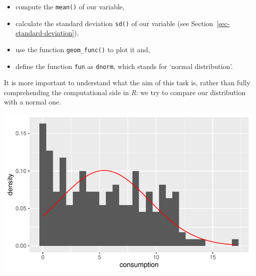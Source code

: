 \documentclass[
  letterpaper,
]{krantz}
\makeatletter
\newenvironment{Shaded}{\begin{snugshade}}{\end{snugshade}}
\newcommand{\AttributeTok}[1]{\textcolor[rgb]{0.40,0.45,0.13}{#1}}
\newcommand{\CommentTok}[1]{\textcolor[rgb]{0.37,0.37,0.37}{#1}}
\newcommand{\DecValTok}[1]{\textcolor[rgb]{0.68,0.00,0.00}{#1}}
\newcommand{\FunctionTok}[1]{\textcolor[rgb]{0.28,0.35,0.67}{#1}}
\newcommand{\NormalTok}[1]{\textcolor[rgb]{0.00,0.23,0.31}{#1}}
\newcommand{\SpecialCharTok}[1]{\textcolor[rgb]{0.37,0.37,0.37}{#1}}
\newcommand{\StringTok}[1]{\textcolor[rgb]{0.13,0.47,0.30}{#1}}
\newenvironment{kframe}{%
\medskip{}
\setlength{\fboxsep}{.8em}
 \def\at@end@of@kframe{}%
 \ifinner\ifhmode%
  \def\at@end@of@kframe{\end{minipage}}%
  \begin{minipage}{\columnwidth}%
 \fi\fi%
 \def\FrameCommand##1{\hskip\@totalleftmargin \hskip-\fboxsep
 \colorbox{shadecolor}{##1}\hskip-\fboxsep
     \hskip-\linewidth \hskip-\@totalleftmargin \hskip\columnwidth}%
 \MakeFramed {\advance\hsize-\width
   \@totalleftmargin\z@ \linewidth\hsize
   \@setminipage}}%
 {\par\unskip\endMakeFramed%
 \at@end@of@kframe}
\renewenvironment{Shaded}{\begin{kframe}}{\end{kframe}}
\makeatother
\begin{document}
\begin{itemize}
\item
  compute the \texttt{mean()} of our variable,
\item
  calculate the standard deviation \texttt{sd()} of our variable (see
  Section~\ref{sec-standard-deviation}),
\item
  use the function \texttt{geom\_func()} to plot it and,
\item
  define the function \texttt{fun} as \texttt{dnorm}, which stands for
  `normal distribution'.
\end{itemize}

It is more important to understand what the aim of this task is, rather
than fully comprehending the computational side in \emph{R}: we try to
compare our distribution with a normal one.

\begin{Shaded}
\end{Shaded}

\includegraphics{08_descriptive_statistics_files/figure-pdf/compare-normal-distribution-to-our-data-1.pdf}
\end{document}
